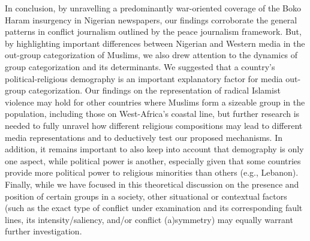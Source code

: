 In conclusion, by unravelling a predominantly war-oriented coverage of the Boko Haram insurgency in Nigerian newspapers, our findings corroborate the general patterns in conflict journalism outlined by the peace journalism framework. But, by highlighting important differences between Nigerian and Western media in the out-group categorization of Muslims, we also drew attention to the dynamics of group categorization and its determinants. We suggested that a country’s political-religious demography is an important explanatory factor for media out-group categorization. Our findings on the representation of radical Islamist violence may hold for other countries where Muslims form a sizeable group in the population, including those on West-Africa’s coastal line, but further research is needed to fully unravel how different religious compositions may lead to different media representations and to deductively test our proposed mechanisms. In addition, it remains important to also keep into account that demography is only one aspect, while political power is another, especially given that some countries provide more political power to religious minorities than others (e.g., Lebanon). Finally, while we have focused in this theoretical discussion on the presence and position of certain groups in a society, other situational or contextual factors (such as the exact type of conflict under examination and its corresponding fault lines, its intensity/saliency, and/or conflict (a)symmetry) may equally warrant further investigation.

\cleardoublepage
